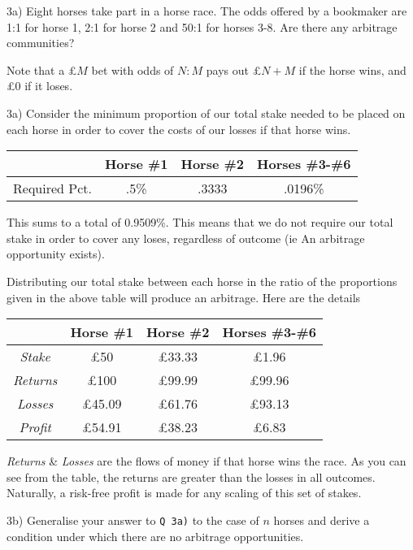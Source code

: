 \documentclass[11pt,a4paper]{article}
\begin{document}
\begin{question}{3a)}
  Eight horses take part in a horse race. The odds offered by a bookmaker are 1:1 for horse 1, 2:1 for horse 2 and 50:1 for horses 3-8. Are there any arbitrage communities?
  \par Note that a £$M$ bet with odds of $N:M$ pays out £$N+M$ if the horse wins, and £0 if it loses.
\end{question}

\begin{answer}{3a)}
  Consider the minimum proportion of our total stake needed to be placed on each horse in order to cover the costs of our losses if that horse wins.
  \begin{center}
    \begin{tabular}{c|c|c|c}
      &Horse \#1&Horse \#2&Horses \#3-\#6\\\hline
      Required Pct.&.5\%&.3333&.0196\%
    \end{tabular}
  \end{center}
  This sums to a total of 0.9509\%. This means that we do not require our total stake in order to cover any loses, regardless of outcome (ie An arbitrage opportunity exists).
  \par Distributing our total stake between each horse in the ratio of the proportions given in the above table will produce an arbitrage. Here are the details
  \begin{center}
    \begin{tabular}{c|c|c|c}
      &Horse \#1&Horse \#2&Horses \#3-\#6\\\hline
      \textit{Stake}&£50&£33.33&£1.96\\\hline
      \textit{Returns}&£100&£99.99&£99.96\\
      \textit{Losses}&£45.09&£61.76&£93.13\\\hline
      \textit{Profit}&£54.91&£38.23&£6.83\\\hline
    \end{tabular}
  \end{center}
  \par \textit{Returns} \& \textit{Losses} are the flows of money if that horse wins the race. As you can see from the table, the returns are greater than the losses in all outcomes. Naturally, a risk-free profit is made for any scaling of this set of stakes.
\end{answer}

\begin{question}{3b)}
  Generalise your answer to \texttt{Q 3a)} to the case of $n$ horses and derive a condition under which there are no arbitrage opportunities.
\end{question}
\end{document}

